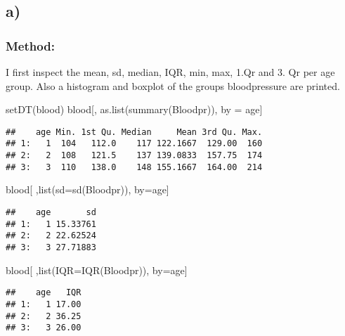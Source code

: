 \documentclass[
]{article}
\newenvironment{Shaded}{\begin{snugshade}}{\end{snugshade}}
\newcommand{\AttributeTok}[1]{\textcolor[rgb]{0.77,0.63,0.00}{#1}}
\newcommand{\FunctionTok}[1]{\textcolor[rgb]{0.00,0.00,0.00}{#1}}
\newcommand{\NormalTok}[1]{#1}
\newcommand{\OtherTok}[1]{\textcolor[rgb]{0.56,0.35,0.01}{#1}}
\begin{document}
\hypertarget{a-1}{%
\subsection{a)}\label{a-1}}

\hypertarget{method-5}{%
\subsubsection{Method:}\label{method-5}}

I first inspect the mean, sd, median, IQR, min, max, 1.Qr and 3. Qr per
age group. Also a histogram and boxplot of the groups bloodpressure are
printed.

\begin{Shaded}
\begin{Highlighting}[]
\FunctionTok{setDT}\NormalTok{(blood)}
\NormalTok{blood[, }\FunctionTok{as.list}\NormalTok{(}\FunctionTok{summary}\NormalTok{(Bloodpr)), by }\OtherTok{=}\NormalTok{ age]}
\end{Highlighting}
\end{Shaded}

\begin{verbatim}
##    age Min. 1st Qu. Median     Mean 3rd Qu. Max.
## 1:   1  104   112.0    117 122.1667  129.00  160
## 2:   2  108   121.5    137 139.0833  157.75  174
## 3:   3  110   138.0    148 155.1667  164.00  214
\end{verbatim}

\begin{Shaded}
\begin{Highlighting}[]
\NormalTok{blood[ ,}\FunctionTok{list}\NormalTok{(}\AttributeTok{sd=}\FunctionTok{sd}\NormalTok{(Bloodpr)), by}\OtherTok{=}\NormalTok{age]}
\end{Highlighting}
\end{Shaded}

\begin{verbatim}
##    age       sd
## 1:   1 15.33761
## 2:   2 22.62524
## 3:   3 27.71883
\end{verbatim}

\begin{Shaded}
\begin{Highlighting}[]
\NormalTok{blood[ ,}\FunctionTok{list}\NormalTok{(}\AttributeTok{IQR=}\FunctionTok{IQR}\NormalTok{(Bloodpr)), by}\OtherTok{=}\NormalTok{age]}
\end{Highlighting}
\end{Shaded}

\begin{verbatim}
##    age   IQR
## 1:   1 17.00
## 2:   2 36.25
## 3:   3 26.00
\end{verbatim}
\end{document}
